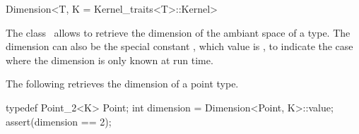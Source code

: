 \begin{ccRefClass} {Dimension<T, K = Kernel_traits<T>::Kernel>}

\ccDefinition
The class \ccRefName\ allows to retrieve the dimension of the ambiant space of
a type.  The dimension can also be the special constant
, which value is , to indicate the case
where the dimension is only known at run time.


\ccConstants


\ccCreation
{}

\ccExample

The following retrieves the dimension of a point type.

\begin{cprog}
  typedef Point_2<K> Point;
  int dimension = Dimension<Point, K>::value;
  assert(dimension == 2);
\end{cprog} 

\ccSeeAlso
{}

\end{ccRefClass} 
